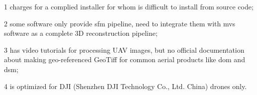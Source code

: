 \begin{table}[htb]
\begin{center}
\begin{threeparttable}
\begin{tablenotes}
        \item[1] charges for a complied installer for whom is difficult to install from source code;
        \item[2] some software only provide \gls{sfm} pipeline, need to integrate them with \gls{mvs} software as a complete 3D reconstruction pipeline;
        \item[3] has video tutorials for processing UAV images, but no official documentation about making geo-referenced GeoTiff for common aerial products like \gls{dom} and \gls{dsm};
        \item[4] is optimized for DJI (Shenzhen DJI Technology Co., Ltd. China) drones only.
      \end{tablenotes}
      \end{threeparttable}
    \end{center}
\end{table}